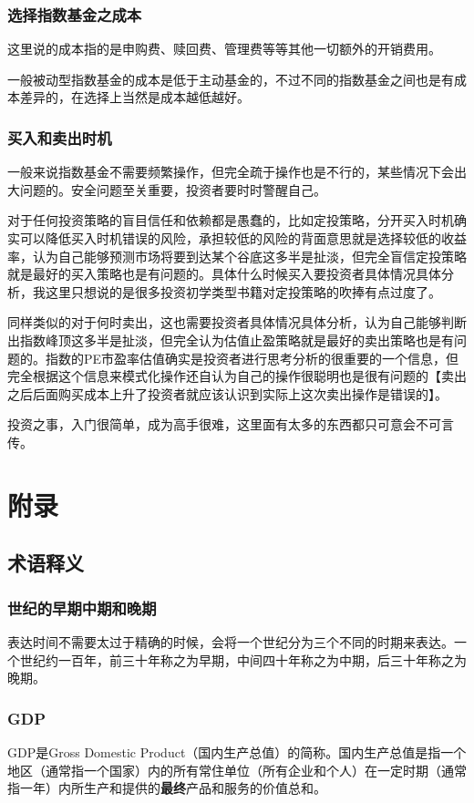 \documentclass[12pt,oneside]{book}
\begin{document}
\section{选择指数基金之成本}
这里说的成本指的是申购费、赎回费、管理费等等其他一切额外的开销费用。

一般被动型指数基金的成本是低于主动基金的，不过不同的指数基金之间也是有成本差异的，在选择上当然是成本越低越好。




\section{买入和卖出时机}
一般来说指数基金不需要频繁操作，但完全疏于操作也是不行的，某些情况下会出大问题的。安全问题至关重要，投资者要时时警醒自己。

对于任何投资策略的盲目信任和依赖都是愚蠢的，比如定投策略，分开买入时机确实可以降低买入时机错误的风险，承担较低的风险的背面意思就是选择较低的收益率，认为自己能够预测市场将要到达某个谷底这多半是扯淡，但完全盲信定投策略就是最好的买入策略也是有问题的。具体什么时候买入要投资者具体情况具体分析，我这里只想说的是很多投资初学类型书籍对定投策略的吹捧有点过度了。

同样类似的对于何时卖出，这也需要投资者具体情况具体分析，认为自己能够判断出指数峰顶这多半是扯淡，但完全认为估值止盈策略就是最好的卖出策略也是有问题的。指数的PE市盈率估值确实是投资者进行思考分析的很重要的一个信息，但完全根据这个信息来模式化操作还自认为自己的操作很聪明也是很有问题的【卖出之后后面购买成本上升了投资者就应该认识到实际上这次卖出操作是错误的】。

投资之事，入门很简单，成为高手很难，这里面有太多的东西都只可意会不可言传。


\appendix
\part{附录}




\chapter{术语释义}
\section{世纪的早期中期和晚期}
表达时间不需要太过于精确的时候，会将一个世纪分为三个不同的时期来表达。一个世纪约一百年，前三十年称之为早期，中间四十年称之为中期，后三十年称之为晚期。

\section{GDP}
GDP是Gross Domestic Product（国内生产总值）的简称。国内生产总值是指一个地区（通常指一个国家）内的所有常住单位（所有企业和个人）在一定时期（通常指一年）内所生产和提供的\textbf{最终}产品和服务的价值总和。
\end{document}
